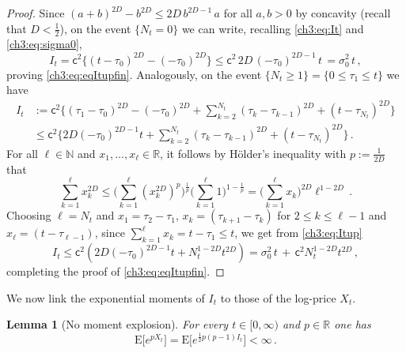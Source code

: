 \documentclass[a4paper,reqno,11pt]{amsart}
\numberwithin{equation}{section}
\newtheorem{lemma}[theorem]{Lemma}
\newcommand{\R}{\mathbb{R}}
\newcommand{\N}{\mathbb{N}}
\newcommand{\PEfont}{\mathrm}
\newcommand{\E}{\ensuremath{\PEfont E}}
\newcommand\sfc{\mathsf{c}}
\begin{document}
\begin{proof}
Since $(a+b)^{2D} - b^{2D} \le 2D \, b^{2D-1} \, a$ for all $a,b > 0$
by concavity (recall that $D < \frac{1}{2}$), on the event $\{N_t = 0\}$ we can write,
recalling \eqref{ch3:eq:It} and \eqref{ch3:eq:sigma0},
\begin{equation} \label{ch3:eq:Nt0}
	I_t = \sfc^2 \big\{ (t-\tau_0)^{2D} - (-\tau_0)^{2D}\big\} \le
	\sfc^2 \, 2D \, (-\tau_0)^{2D-1} \, t \, = \sigma_0^2 \, t \,,
\end{equation}
proving \eqref{ch3:eq:eqItupfin}.
Analogously, on the event $\{N_t \ge 1\} = \{0 \le \tau_1 \le t\}$ we have
\begin{equation}\label{ch3:eq:Itup}
 \begin{split}
I_t& := \sfc^2 \Bigg\{ (\tau_1-\tau_{0})^{2D} - (-\tau_0)^{2D} +
	\sum_{k=2}^{N_t} (\tau_k - \tau_{k-1})^{2D}
	+ (t-\tau_{N_t})^{2D} \Bigg\} \\
	& \leq  \sfc^2 \Bigg\{  2D(-\tau_0)^{2D-1}t+
	\sum_{k=2}^{N_t} (\tau_k - \tau_{k-1})^{2D}
	+ (t-\tau_{N_t})^{2D} \Bigg\} \,.
 \end{split}
\end{equation}
For all $\ell\in\N$ and $x_1, \ldots, x_\ell \in \R$,
it follows by H\"older's inequality with $p := \frac{1}{2D}$ that 
\begin{equation} \label{ch3:eq:Hold}
	\sum_{k=1}^\ell x_k^{2D} \leq 
	\Bigg( \sum_{k=1}^\ell (x_k^{2D})^p \Bigg)^{\frac{1}{p}}
	\Bigg( \sum_{k=1}^\ell 1 \Bigg)^{1-\frac{1}{p}}
	= \Bigg( \sum_{k=1}^\ell x_k \Bigg)^{2D} \ell^{1-2D} \,.
\end{equation}
Choosing $\ell = N_t$
and $x_1 = \tau_2-\tau_1$, $x_k = (\tau_{k+1} - \tau_{k})$ 
for $2 \le k \le \ell-1$
and $x_\ell = (t-\tau_{\ell-1})$,
since $\sum_{k=1}^\ell x_k = t - \tau_1 \le t$, we get from \eqref{ch3:eq:Itup}
\begin{equation*}
	I_t\leq \sfc^2 \left(2D(-\tau_0)^{2D-1}t+N_t^{1-2D}t^{2D}\right) =
	\sigma_0^2 \, t \,+\, \sfc^2 N_t^{1-2D}t^{2D} \,,
\end{equation*}
completing the proof of \eqref{ch3:eq:eqItupfin}.
\end{proof}

We now link the exponential moments of $I_t$ to those of the log-price $X_t$.

\begin{lemma}[No moment explosion]\label{ch3:th:noexpl}
For every $t \in [0,\infty)$ and $p \in 	\R$ one has
\begin{equation}\label{ch3:eq:noexpl}
	\E\big[e^{p X_t}\big] = \E\big[ e^{\frac{1}{2}p(p-1)I_t} \big] < \infty \,.
\end{equation}
\end{lemma}
\end{document}
